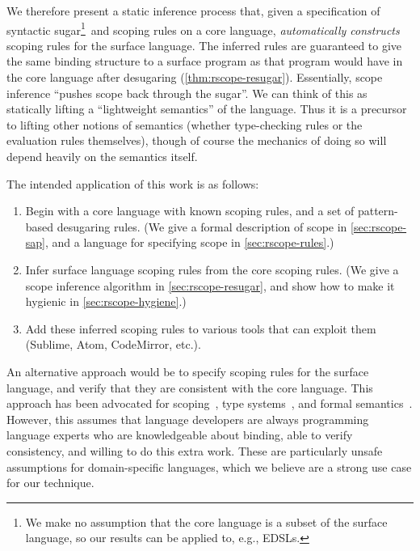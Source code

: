 We therefore present a static inference process that, given a
specification of syntactic sugar\footnote{
  We make no assumption that the core language is a subset of the
  surface language, so our results can be applied to, e.g., EDSLs.
}\,%
and scoping rules on a core language,
\emph{automatically constructs} scoping rules for the surface
language. The inferred rules are guaranteed to give the same binding
structure to a surface program as that program would have in the core language
after desugaring (\cref{thm:rscope-resugar}).
Essentially, scope inference ``pushes scope back through the sugar''. We
can think of this as statically lifting a ``lightweight semantics'' of
the language. Thus it is a precursor to lifting other notions of semantics
(whether type-checking rules or the evaluation rules themselves),
though of course the mechanics of doing so will depend heavily on the
semantics itself.

The intended application of this work is as follows:
\begin{enumerate}
\item Begin with a core language with known scoping rules, and a set
  of pattern-based desugaring rules. (We give a formal description of
  scope in \cref{sec:rscope-sap}, and a language for specifying scope in
  \cref{sec:rscope-rules}.)
\item Infer surface language scoping rules from the core scoping
  rules. (We give a scope inference algorithm in
  \cref{sec:rscope-resugar}, and show how to make it hygienic in
  \cref{sec:rscope-hygiene}.)
\item Add these inferred scoping rules to various tools that can exploit
  them (Sublime, Atom, CodeMirror, etc.).
\end{enumerate}

An alternative approach would be to specify scoping rules for the
surface language, and verify that they are consistent with the core
language. This approach has been advocated for
scoping~\cite{herman-hygiene,stansifer-romeo},
type systems~\cite{typechecking-exts},
and formal semantics~\cite{ziggurat}.
However, this assumes that language developers are always programming
language experts who are knowledgeable about binding, able to verify consistency, and willing
to do this extra work. These are particularly unsafe assumptions for
domain-specific languages, which we believe are a strong use case for
our technique.


